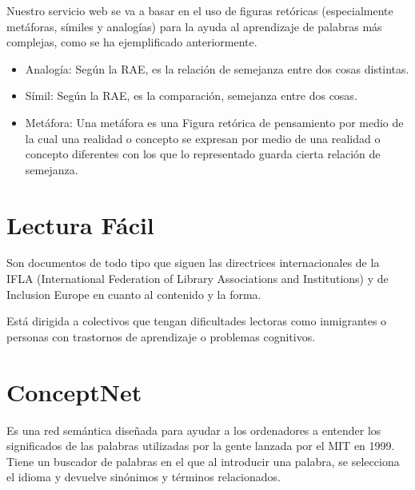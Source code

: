 Nuestro servicio web se va a basar en el uso de figuras retóricas (especialmente metáforas, símiles y analogías) para la ayuda al aprendizaje de palabras más complejas, como se ha ejemplificado anteriormente.

\begin{itemize}
\item Analogía: Según la RAE, es la relación de semejanza entre dos cosas distintas.
\item Símil: Según la RAE, es la comparación, semejanza entre dos cosas.
\item Metáfora: Una metáfora es una Figura retórica de pensamiento por medio de la cual una realidad o concepto se expresan por medio de una realidad o concepto diferentes con los que lo representado guarda cierta relación de semejanza.
\end{itemize}



\section{Lectura Fácil}

Son documentos de todo tipo que siguen las directrices internacionales de la IFLA (International Federation of Library Associations and Institutions) y de Inclusion Europe en cuanto al contenido y la forma.

Está dirigida a colectivos que tengan dificultades lectoras como inmigrantes o personas con trastornos de aprendizaje o problemas cognitivos.

\section{ConceptNet} 

Es una red semántica diseñada para ayudar a los ordenadores a entender los significados de las palabras utilizadas por la gente lanzada por el MIT en 1999.
Tiene un buscador de palabras en el que al introducir una palabra, se selecciona el idioma y devuelve sinónimos y términos relacionados.

